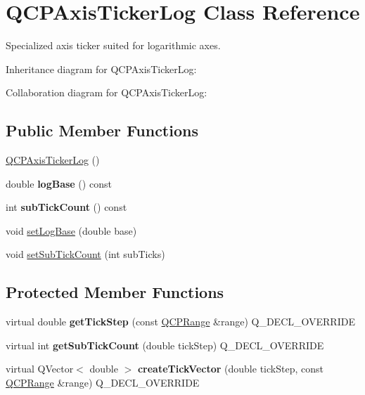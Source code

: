 \hypertarget{classQCPAxisTickerLog}{}\section{Q\+C\+P\+Axis\+Ticker\+Log Class Reference}
\label{classQCPAxisTickerLog}


Specialized axis ticker suited for logarithmic axes.  




Inheritance diagram for Q\+C\+P\+Axis\+Ticker\+Log\+:


Collaboration diagram for Q\+C\+P\+Axis\+Ticker\+Log\+:
\subsection*{Public Member Functions}
\begin{DoxyCompactItemize}
\item 
\hyperlink{classQCPAxisTickerLog_af3cb86ea5eef2023c0b96b5260c4cbdf}{Q\+C\+P\+Axis\+Ticker\+Log} ()
\item 
\mbox{\label{classQCPAxisTickerLog_a841a97f2b6850ff1ef3aa73e89d94775}} 
double {\bfseries log\+Base} () const
\item 
\mbox{\label{classQCPAxisTickerLog_aebe43661977364fc1fd220fa1ae36a10}} 
int {\bfseries sub\+Tick\+Count} () const
\item 
void \hyperlink{classQCPAxisTickerLog_ac6e3b4e03baea3816f898869ab9751ef}{set\+Log\+Base} (double base)
\item 
void \hyperlink{classQCPAxisTickerLog_ad51989c798c0cfd50936d77aac57c56a}{set\+Sub\+Tick\+Count} (int sub\+Ticks)
\end{DoxyCompactItemize}
\subsection*{Protected Member Functions}
\begin{DoxyCompactItemize}
\item 
\mbox{\label{classQCPAxisTickerLog_a57be974214a065d3247406331f02fa49}} 
virtual double {\bfseries get\+Tick\+Step} (const \hyperlink{classQCPRange}{Q\+C\+P\+Range} \&range) Q\+\_\+\+D\+E\+C\+L\+\_\+\+O\+V\+E\+R\+R\+I\+DE
\item 
\mbox{\label{classQCPAxisTickerLog_a352fef7ae68837acd26e35188aa86167}} 
virtual int {\bfseries get\+Sub\+Tick\+Count} (double tick\+Step) Q\+\_\+\+D\+E\+C\+L\+\_\+\+O\+V\+E\+R\+R\+I\+DE
\item 
\mbox{\label{classQCPAxisTickerLog_af8873a8d1d2b9392d8f7a73218c889ab}} 
virtual Q\+Vector$<$ double $>$ {\bfseries create\+Tick\+Vector} (double tick\+Step, const \hyperlink{classQCPRange}{Q\+C\+P\+Range} \&range) Q\+\_\+\+D\+E\+C\+L\+\_\+\+O\+V\+E\+R\+R\+I\+DE
\end{DoxyCompactItemize}
